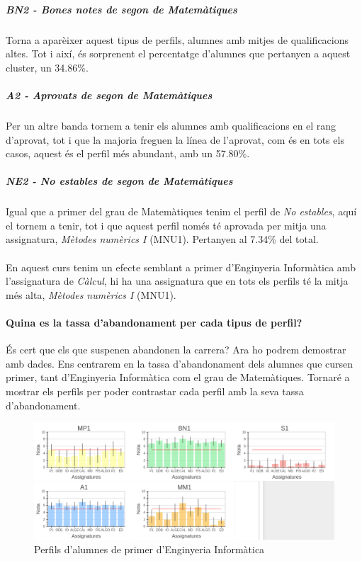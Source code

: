 \documentclass[12pt,a4paper,catalan]{article}
\begin{document}
\newpage

\subparagraph{BN2 - Bones notes de segon de Matemàtiques}
Torna a aparèixer aquest tipus de perfils, alumnes amb mitjes de qualificacions altes. Tot i així, és sorprenent el percentatge d'alumnes que pertanyen a aquest cluster, un 34.86\%.

\subparagraph{A2 - Aprovats de segon de Matemàtiques}
Per un altre banda tornem a tenir els alumnes amb qualificacions en el rang d'aprovat, tot i que la majoria freguen la línea de l'aprovat, com és en tots els casos, aquest és el perfil més abundant, amb un 57.80\%.

\subparagraph{NE2 - No estables de segon de Matemàtiques}
Igual que a primer del grau de Matemàtiques tenim el perfil de \textit{No estables}, aquí el tornem a tenir, tot i que aquest perfil només té aprovada per mitja una assignatura, \textit{Mètodes numèrics I} (MNU1). Pertanyen al 7.34\% del total.
\\
\\
En aquest curs tenim un efecte semblant a primer d'Enginyeria Informàtica amb l'assignatura de \textit{Càlcul}, hi ha una assignatura que en tots els perfils té la mitja més alta, \textit{Mètodes numèrics I} (MNU1).

\newpage

\paragraph{Quina es la tassa d'abandonament per cada tipus de perfil?}
És cert que els que suspenen abandonen la carrera? Ara ho podrem demostrar amb dades. Ens centrarem en la tassa d'abandonament dels alumnes que cursen primer, tant d'Enginyeria Informàtica com el grau de Matemàtiques. Tornaré a mostrar els perfils per poder contrastar cada perfil amb la seva tassa d'abandonament.

\begin{figure}[h]
\centering
\includegraphics[width=\linewidth]{img/perfils_primer_info.png}
\caption{Perfils d'alumnes de primer d'Enginyeria Informàtica}
\end{figure}
\end{document}
